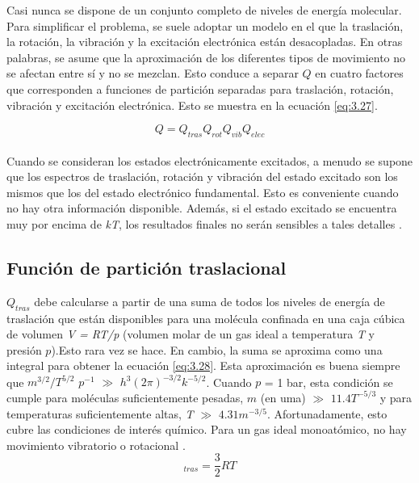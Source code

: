 Casi nunca se dispone de un conjunto completo de niveles de energía molecular. Para
simplificar el problema, se suele adoptar un modelo en el que la traslación, la rotación, la vibración y la excitación electrónica están desacopladas. En otras palabras, se asume que la aproximación de los diferentes tipos de movimiento no se afectan entre sí y no se mezclan. Esto conduce  a separar $Q$ en cuatro factores que corresponden a funciones de partición separadas para traslación, rotación, vibración y excitación electrónica. Esto se muestra en la ecuación \ref{eq:3.27}.

\begin{equation}
Q = Q_{tras}Q_{rot}Q_{vib}Q_{elec}
\label{eq:3.27}
\end{equation}\\

Cuando se consideran los estados electrónicamente excitados, a menudo se supone que
los espectros de traslación, rotación y vibración del estado excitado son los mismos que los del estado electrónico fundamental. Esto es conveniente cuando no hay otra información disponible. Además, si el estado excitado se encuentra muy por encima de \textit{kT}, los resultados finales no serán sensibles a tales detalles \cite{Irikura1998}. \\


\subsection{Función de partición traslacional}

$Q_{tras}$ debe calcularse a partir de una suma de todos los niveles de
energía de traslación que están disponibles para una molécula confinada en una caja
cúbica de volumen \textit{V = RT/p} (volumen molar de un gas ideal a temperatura \textit{T} y presión $p$).Esto rara vez se hace. En cambio, la suma se aproxima como una integral para obtener la ecuación \ref{eq:3.28}. Esta aproximación es buena siempre que $m^{3/2}/T^{5/2}$ $p^{-1}$ $\gg$ $h^{3}(2\pi)^{-3/2}k^{-5/2}$. Cuando $p$ = 1 bar, esta condición se cumple para moléculas suficientemente pesadas, $m$ (en uma) $\gg$ $11.4 T^{-5/3}$ y para temperaturas suficientemente altas, \textit{T} $\gg$ $4.31 m^{-3/5}$. Afortunadamente, esto cubre las condiciones de interés químico. Para un gas ideal monoatómico, no hay movimiento vibratorio o rotacional \cite{Irikura1998}.\\

\begin{equation}
[H(T)-H(0)]_{tras} = \frac{3}{2} RT
\label{eq:3.28}
\end{equation}\\

